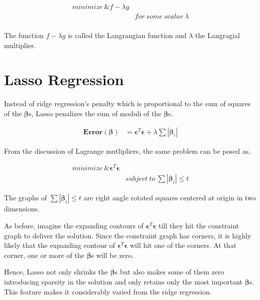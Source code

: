 \documentclass[11pt, a4paper]{article}
\begin{document}
\begin{align*}
	minimize\ \&f - \lambda g &                            \\
	            & for\ some\ scalar\ \lambda \\
\end{align*}

The function $f - \lambda g$ is called the Langrangian function and $\lambda$ the Langragial multiplier.

\section{Lasso Regression}

Instead of ridge regression's penalty which is proportional to the sum of squares of the $\boldsymbol\beta$s, Lasso penalizes the sum of moduli of the $\boldsymbol\beta$s. 

\begin{align*}
	\mathbf{Error}(\boldsymbol{\beta}) & = \boldsymbol{\epsilon}^T\boldsymbol{\epsilon} + \lambda \sum |\boldsymbol\beta_i| 
\end{align*}

From the discussion of Lagrange mutlipliers, the same problem can be posed as, 

\begin{align*}
	minimize\ \&\boldsymbol{\epsilon}^T\boldsymbol{\epsilon} &                                               \\
	            & subject\ to\ \sum |\boldsymbol\beta_i| \leq t 
\end{align*}

The graphs of $\sum |\boldsymbol\beta_i| \leq t$ are right angle rotated squares centered at origin in two dimensions. 

As before, imagine the expanding contours of $\boldsymbol{\epsilon}^T\boldsymbol{\epsilon}$ till they hit the constraint graph to deliver the solution. Since the constraint graph has corners, it is highly likely that the expanding contour of $\boldsymbol{\epsilon}^T\boldsymbol{\epsilon}$ will hit one of the corners. At that corner, one or more of the $\boldsymbol\beta$s will be zero.

Hence, Lasso not only shrinks the $\boldsymbol\beta$s but also makes some of them zero introducing sparsity in the solution and only retains only the most important $\boldsymbol\beta$s. This feature makes it considerably varied from the ridge regression.     
\end{document}
